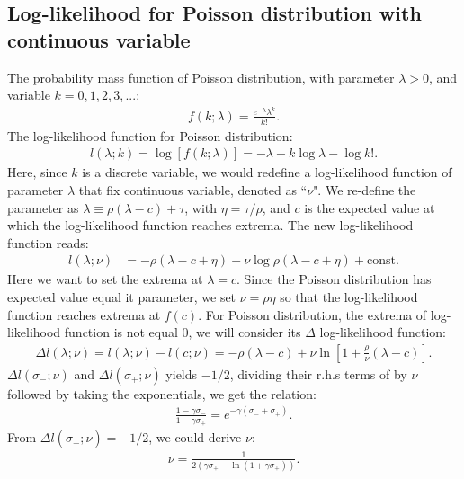 \documentclass[submission, Phys]{SciPost}
\begin{document}
\begin{appendix}
\subsection{Log-likelihood for Poisson distribution with continuous variable}
The probability mass function of Poisson distribution, with parameter $\lambda>0$, and variable $k = 0,1,2,3, ...$:
\begin{align}
f(k; \lambda)= \frac{e^{-\lambda}\lambda^k}{k!}.
\end{align}
The log-likelihood function for Poisson distribution:
\begin{align}
l(\lambda; k) = \log [f(k;\lambda)]=-\lambda + k\log \lambda - \log k!. \label{P_llh}
\end{align}
Here, since $k$ is a discrete variable, we would redefine a log-likelihood function of parameter $\lambda$ that fix continuous variable, denoted as ``$\nu$". We re-define the parameter as $\lambda \equiv \rho(\lambda-c)+ \tau$, with $\eta = {\tau}/{\rho}$, and $c$ is the expected value at which the log-likelihood function reaches extrema. The new log-likelihood function reads:
\begin{align}
l(\lambda;\nu)&=-\rho(\lambda-c+\eta)+\nu\log\rho(\lambda-c+\eta)+\text{const}.
\end{align}
Here we want to set the extrema at $\lambda=c$. Since the Poisson distribution has expected value equal it parameter, we set $\nu = \rho\eta$ so that the log-likelihood function reaches extrema at $f(c)$. For Poisson distribution, the extrema of log-likelihood function is not equal 0, we will consider its $\Delta$ log-likelihood function:
\begin{align}
\Delta l(\lambda;\nu)=l(\lambda;\nu)-l(c;\nu)=	-\rho (\lambda-c)+\nu\ln\left[1+\frac{\rho}{\nu}( \lambda-c)\right].\label{P_delta_llh}
\end{align}
$\Delta l(\sigma_-;\nu)$ and $\Delta l(\sigma_+;\nu)$ yields $-1/2$, dividing their r.h.s terms of by $\nu$ followed by taking the exponentials, we get the relation:
\begin{align}
\frac{1-\gamma\sigma_-}{1-\gamma\sigma_+}=e^{-\gamma(\sigma_-+\sigma_+)}.
\end{align}
From $\Delta l(\sigma_+;\nu) = -1/2$, we could derive $\nu$:
\begin{align}
\nu=\frac{1}{2(\gamma\sigma_+-\ln(1+\gamma\sigma_+))}.
\end{align}

\end{appendix}
\end{document}
